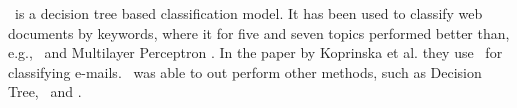 \rf\ is a decision tree based classification model. It has been used to classify web documents by keywords, where it for five and seven topics performed better than, e.g., \nb\ and Multilayer Perceptron \cite{keywords}. In the paper by Koprinska et al. they use \rf\ for classifying e-mails. \rf\ was able to out perform other methods, such as Decision Tree, \svm\ and \nb. \cite{email}